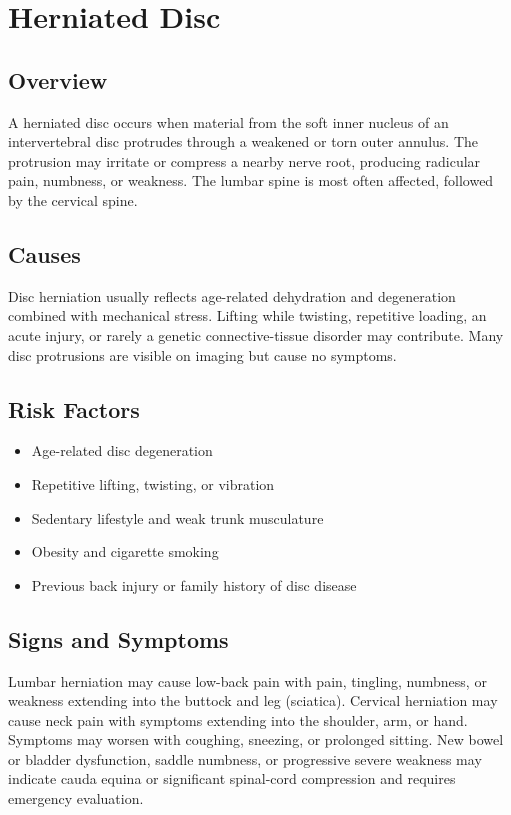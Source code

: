 \chapter{Herniated Disc}
\label{sec:Herniated Disc}

\section{Overview}
A herniated disc occurs when material from the soft inner nucleus of an intervertebral disc protrudes through a weakened or torn outer annulus. The protrusion may irritate or compress a nearby nerve root, producing radicular pain, numbness, or weakness. The lumbar spine is most often affected, followed by the cervical spine.
\section{Causes}
Disc herniation usually reflects age-related dehydration and degeneration combined with mechanical stress. Lifting while twisting, repetitive loading, an acute injury, or rarely a genetic connective-tissue disorder may contribute. Many disc protrusions are visible on imaging but cause no symptoms.
\section{Risk Factors}
\begin{itemize}[noitemsep]
  \item Age-related disc degeneration
  \item Repetitive lifting, twisting, or vibration
  \item Sedentary lifestyle and weak trunk musculature
  \item Obesity and cigarette smoking
  \item Previous back injury or family history of disc disease
\end{itemize}
\section{Signs and Symptoms}
Lumbar herniation may cause low-back pain with pain, tingling, numbness, or weakness extending into the buttock and leg (sciatica). Cervical herniation may cause neck pain with symptoms extending into the shoulder, arm, or hand. Symptoms may worsen with coughing, sneezing, or prolonged sitting. New bowel or bladder dysfunction, saddle numbness, or progressive severe weakness may indicate cauda equina or significant spinal-cord compression and requires emergency evaluation.
